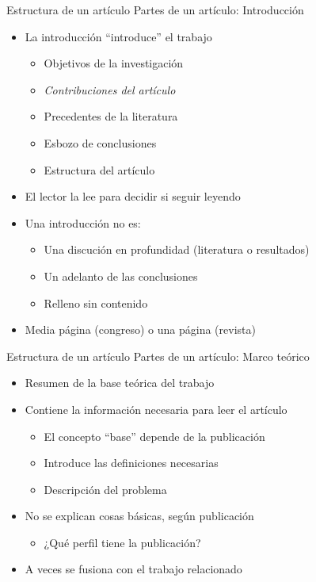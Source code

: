 \documentclass{beamer}
\begin{document}
\begin{frame}{Estructura de un artículo} {Partes de un artículo: Introducción}
	\begin{itemize}
		\item La introducción ``introduce'' el trabajo
		\begin{itemize}
			\item Objetivos de la investigación
			\item \textit{Contribuciones del artículo}
			\item Precedentes de la literatura
			\item Esbozo de conclusiones
			\item Estructura del artículo
		\end{itemize}
		\item El lector la lee para decidir si seguir leyendo
		\item Una introducción no es:
		\begin{itemize}
			\item Una discución en profundidad (literatura o resultados)
			\item Un adelanto de las conclusiones
			\item Relleno sin contenido
		\end{itemize}
		\item Media página (congreso) o una página (revista)
	\end{itemize}
\end{frame}

\begin{frame}{Estructura de un artículo} {Partes de un artículo: Marco teórico}
	\begin{itemize}
		\item Resumen de la base teórica del trabajo
		\item Contiene la información necesaria para leer el artículo
			\begin{itemize}
			\item El concepto ``base'' depende de la publicación
			\item Introduce las definiciones necesarias
			\item Descripción del problema
			\end{itemize}
		\item No se explican cosas básicas, según publicación
			\begin{itemize}
			\item ¿Qué perfil tiene la publicación?
			\end{itemize}
		\item A veces se fusiona con el trabajo relacionado
	\end{itemize}
\end{frame}
\end{document}
